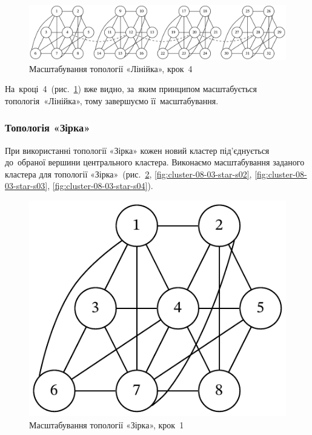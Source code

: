 \documentclass[
	a4paper,
	oneside,
	BCOR = 10mm,
	DIV = 12,
	12pt,
	headings = normal,
]{scrartcl}
\begin{document}
				\begin{figure}[!htbp]
					\centering
					\includegraphics[width=\columnwidth]{./assets/cluster-08-02-line-s04.pdf}
					\caption{Масштабування топології «Лінійка», крок~4}
					\label{fig:cluster-08-02-line-s04}
				\end{figure}

				На~кроці~4~(рис.~\ref{fig:cluster-08-02-line-s04}) вже видно, за~яким принципом масштабується топологія~«Лінійка», тому завершуємо її~масштабування.

			\subsubsection{Топологія «Зірка»}
				При використанні топології «Зірка» кожен новий кластер під'\-є\-дну\-є\-ться до~обраної вершини центрального кластера. Виконаємо масштабування заданого кластера для топології «Зірка»~(рис.~\ref{fig:cluster-08-03-star-s01}, \ref{fig:cluster-08-03-star-s02}, \ref{fig:cluster-08-03-star-s03}, \ref{fig:cluster-08-03-star-s04}).

				\begin{figure}[!htbp]
					\centering
					\includegraphics[height=5\baselineskip]{./assets/cluster-08-01-named.pdf}
					\caption{Масштабування топології «Зірка», крок~1}
					\label{fig:cluster-08-03-star-s01}
				\end{figure}
\end{document}
